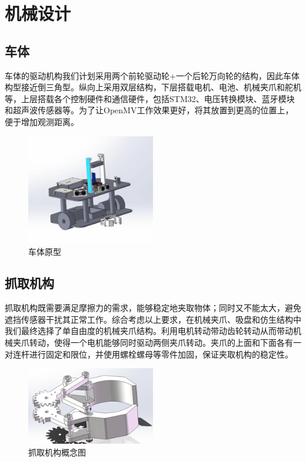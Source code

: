 \documentclass{report}
\begin{document}
\section{机械设计}
\subsection{车体}
\label{subsec:label}
车体的驱动机构我们计划采用两个前轮驱动轮+一个后轮万向轮的结构，因此车体构型接近倒三角型。纵向上采用双层结构，下层搭载电机、电池、机械夹爪和舵机等，上层搭载各个控制硬件和通信硬件，包括STM32、电压转换模块、蓝牙模块和超声波传感器等。为了让OpenMV工作效果更好，将其放置到更高的位置上，便于增加观测距离。
\begin{figure}[ht]
  \centering
  \includegraphics[width=0.5\textwidth]{figures/body.jpg}
  \caption{车体原型}
\end{figure}

\subsection{抓取机构}
抓取机构既需要满足摩擦力的需求，能够稳定地夹取物体；同时又不能太大，避免遮挡传感器干扰其正常工作。综合考虑以上要求，在机械夹爪、吸盘和仿生结构中我们最终选择了单自由度的机械夹爪结构。利用电机转动带动齿轮转动从而带动机械夹爪转动，使得一个电机能够同时驱动两侧夹爪转动。夹爪的上面和下面各有一对连杆进行固定和限位，并使用螺栓螺母等零件加固，保证夹取机构的稳定性。
\begin{figure}[ht]
  \centering
  \includegraphics[width=0.5\textwidth]{figures/pickup.png}
  \caption{抓取机构概念图 }
\end{figure}
\newpage
\end{document}
